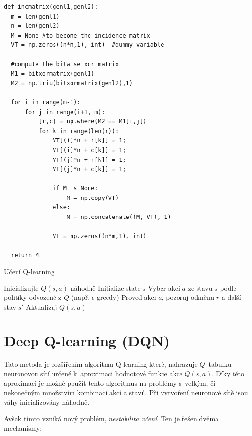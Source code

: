 \begin{verbatim}
def incmatrix(genl1,genl2):
  m = len(genl1)
  n = len(genl2)
  M = None #to become the incidence matrix
  VT = np.zeros((n*m,1), int)  #dummy variable
  
  #compute the bitwise xor matrix
  M1 = bitxormatrix(genl1)
  M2 = np.triu(bitxormatrix(genl2),1) 

  for i in range(m-1):
      for j in range(i+1, m):
          [r,c] = np.where(M2 == M1[i,j])
          for k in range(len(r)):
              VT[(i)*n + r[k]] = 1;
              VT[(i)*n + c[k]] = 1;
              VT[(j)*n + r[k]] = 1;
              VT[(j)*n + c[k]] = 1;
              
              if M is None:
                  M = np.copy(VT)
              else:
                  M = np.concatenate((M, VT), 1)
              
              VT = np.zeros((n*m,1), int)
  
  return M

\end{verbatim}

\begin{algorithm}
\caption{Učení Q-learning}
\begin{algorithmic}[1]
\State Inicializujte $Q(s, a)$ náhodně
    \State Initialize state $s$
      \State Vyber akci $a$ ze stavu $s$ podle politiky odvozené z $Q$ (např. $\epsilon$-greedy)
      \State Proveď akci $a$, pozoruj odměnu $r$ a další stav $s'$
      \State Aktualizuj $Q(s, a)$
    \EndFor
\EndFor
\end{algorithmic}
\end{algorithm}


\section{Deep Q-learning (DQN)}\label{subsec:deep-q-learning}

Tato metoda je rozšířením algoritmu Q-learning které,
nahrazuje $Q$--tabulku neuronovou sítí určené k~aproximaci hodnotové funkce akce $Q(s, a)$.
Díky této aproximaci je možné použít tento algoritmus na problémy s~velkým, či nekonečným množstvím kombinací akcí a stavů.
Při vytvoření neuronové sítě jsou váhy inicializovány náhodně.

Avšak tímto vzniká nový problém, \emph{nestabilita učení}.
Ten je řešen dvěma mechanismy:

